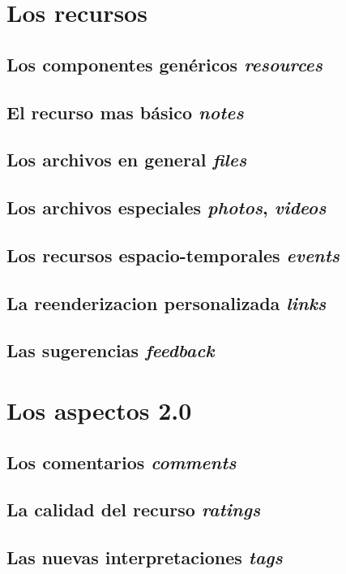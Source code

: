 \section{Los recursos}

\subsection{Los componentes genéricos \emph{resources}}
\subsection{El recurso mas básico \emph{notes}}
\subsection{Los archivos en general \emph{files}}
\subsection{Los archivos especiales \emph{photos}, \emph{videos}}
\subsection{Los recursos espacio-temporales \emph{events}}
\subsection{La reenderizacion personalizada \emph{links}}
\subsection{Las sugerencias \emph{feedback}}


\section{Los aspectos 2.0}

\subsection{Los comentarios \emph{comments}}
\subsection{La calidad del recurso \emph{ratings}}
\subsection{Las nuevas interpretaciones \emph{tags}}
